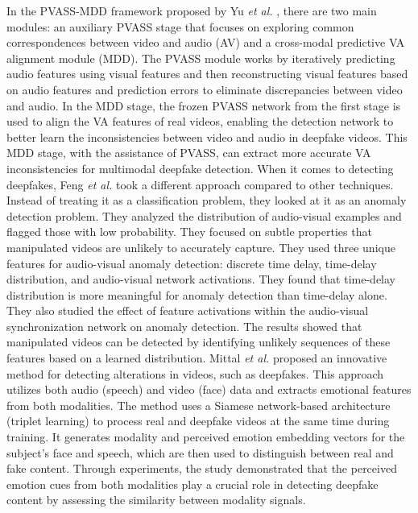 In the PVASS-MDD framework proposed by Yu \textit{et al.} \cite{yu2023pvass}, there are two main modules: an auxiliary PVASS stage that focuses on exploring common correspondences between video and audio (AV) and a cross-modal predictive VA alignment module (MDD). The PVASS module works by iteratively predicting audio features using visual features and then reconstructing visual features based on audio features and prediction errors to eliminate discrepancies between video and audio. In the MDD stage, the frozen PVASS network from the first stage is used to align the VA features of real videos, enabling the detection network to better learn the inconsistencies between video and audio in deepfake videos. This MDD stage, with the assistance of PVASS, can extract more accurate VA inconsistencies for multimodal deepfake detection. When it comes to detecting deepfakes, Feng \textit{et al.} \cite{feng2023self} took a different approach compared to other techniques. Instead of treating it as a classification problem, they looked at it as an anomaly detection problem. They analyzed the distribution of audio-visual examples and flagged those with low probability. They focused on subtle properties that manipulated videos are unlikely to accurately capture. They used three unique features for audio-visual anomaly detection: discrete time delay, time-delay distribution, and audio-visual network activations. They found that time-delay distribution is more meaningful for anomaly detection than time-delay alone. They also studied the effect of feature activations within the audio-visual synchronization network on anomaly detection. The results showed that manipulated videos can be detected by identifying unlikely sequences of these features based on a learned distribution. Mittal \textit{et al.} \cite{mittal2020emotions} proposed an innovative method for detecting alterations in videos, such as deepfakes. This approach utilizes both audio (speech) and video (face) data and extracts emotional features from both modalities. The method uses a Siamese network-based architecture (triplet learning) to process real and deepfake videos at the same time during training. It generates modality and perceived emotion embedding vectors for the subject's face and speech, which are then used to distinguish between real and fake content. Through experiments, the study demonstrated that the perceived emotion cues from both modalities play a crucial role in detecting deepfake content by assessing the similarity between modality signals. 

